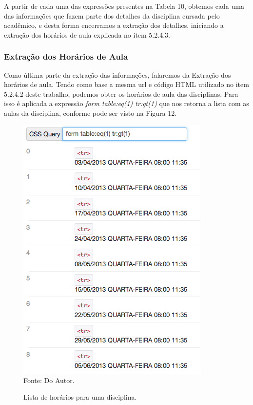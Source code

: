 
A partir de cada uma das expressões presentes na Tabela 10, obtemos cada uma das informações que fazem parte dos detalhes da disciplina cursada pelo acadêmico, e desta forma encerramos a extração dos detalhes, iniciando a extração dos horários de aula explicada no item 5.2.4.3.

\subsubsection{Extração dos Horários de Aula}
Como última parte da extração das informações, falaremos da Extração dos horários de aula. Tendo como base a mesma url e código HTML utilizado no item 5.2.4.2 deste trabalho, podemos obter os horários de aula das disciplinas. Para isso é aplicada a expressão \emph{form table:eq(1) tr:gt(1)} que nos retorna a lista com as aulas da disciplina, conforme pode ser visto na Figura 12.

\begin{figure}[!htb]
     \centering
     \caption[Extração de Informações - Horários do Semestre]{Lista de horários para uma disciplina.}
     \includegraphics[scale=0.5]{imagens/listahorariossemestre.png}
     \\  Fonte: Do Autor.
\end{figure}


